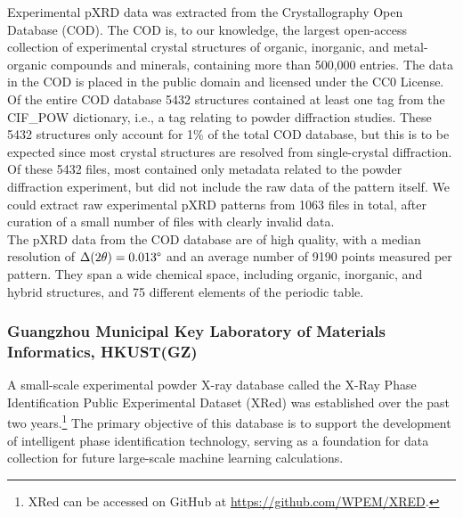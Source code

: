 Experimental pXRD data was extracted from the Crystallography Open Database (COD)\cite{Grazulis2009, Vaitkus2023}. The COD is, to our knowledge, the largest open-access collection of experimental crystal structures of organic, inorganic, and metal-organic compounds and minerals, containing more than 500,000 entries. The data in the COD is placed in the public domain and licensed under the CC0 License. Of the entire COD database 5432 structures contained at least one tag from the {CIF\_POW} dictionary, i.e., a tag relating to powder diffraction studies. These 5432 structures only account for 1\% of the total COD database, but this is to be expected since most crystal structures are resolved from single-crystal diffraction. Of these 5432 files, most contained only metadata related to the powder diffraction experiment, but did not include the raw data of the pattern itself. We could extract raw experimental pXRD patterns from 1063 files in total, after curation of a small number of files with clearly invalid data. \\

The pXRD data from the COD database are of high quality, with a median resolution of $\Delta(2\theta) = 0.013\degree$ and an average number of 9190 points measured per pattern. They span a wide chemical space, including organic, inorganic, and hybrid structures, and 75 different elements of the periodic table.


\subsubsection*{Guangzhou Municipal Key Laboratory of Materials Informatics, HKUST(GZ)}


A small-scale experimental powder X-ray database called the X-Ray Phase Identification Public Experimental Dataset (XRed) was established over the past two years.\footnote{XRed can be accessed on GitHub at \url{https://github.com/WPEM/XRED}.} The primary objective of this database is to support the development of intelligent phase identification technology, serving as a foundation for data collection for future large-scale machine learning calculations. \\

